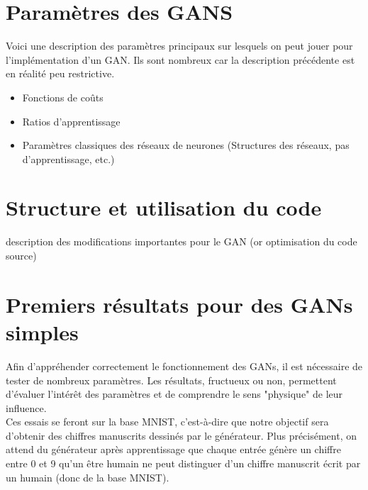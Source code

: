 \section{Paramètres des GANS}

	Voici une description des paramètres principaux sur lesquels on peut jouer pour l'implémentation d'un GAN. Ils sont nombreux car la description précédente est en réalité peu restrictive.

	\begin{itemize}
	 	\item Fonctions de coûts
	 	\item Ratios d'apprentissage
	 	\item Paramètres classiques des réseaux de neurones (Structures des réseaux, pas d'apprentissage, etc.)
	\end{itemize}


\section{Structure et utilisation du code}
	{description des modifications importantes pour le GAN (or optimisation du code source)}


\section{Premiers résultats pour des GANs simples}
	Afin d'appréhender correctement le fonctionnement des GANs, il est nécessaire de tester de nombreux paramètres. Les résultats, fructueux ou non, permettent d'évaluer l'intérêt des paramètres et de comprendre le sens "physique" de leur influence.\\
	Ces essais se feront sur la base MNIST, c'est-à-dire que notre objectif sera d'obtenir des chiffres manuscrits dessinés par le générateur. Plus précisément, on attend du générateur après apprentissage que chaque entrée génère un chiffre entre 0 et 9 qu'un être humain ne peut distinguer d'un chiffre manuscrit écrit par un humain (donc de la base MNIST).

